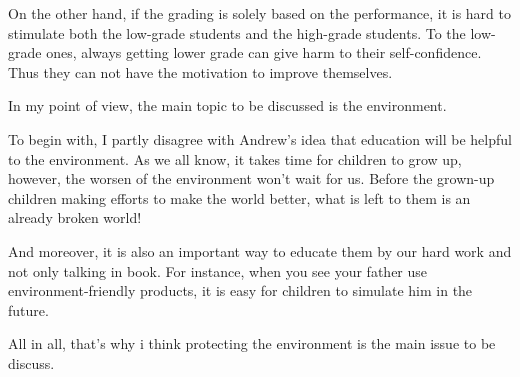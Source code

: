 On the other hand, if the grading is solely based on the performance, it is hard to stimulate both the low-grade students and the high-grade students. To the low-grade ones, always getting lower grade can give harm to their self-confidence. Thus they can not have the motivation to improve themselves.


In my point of view, the main topic to be discussed is the environment.

To begin with, I partly disagree with Andrew's idea that education will be helpful to the environment. As we all know, it takes time for children to grow up, however, the worsen of the environment won't wait for us. Before the grown-up children making efforts to make the world better, what is left to them is an already broken world!

And moreover, it is also an important way to educate them by our hard work and not only talking in book. For instance, when you see your father use environment-friendly products, it is easy for children to simulate him in the future.

All in all, that's why i think protecting the environment is the main issue to be discuss.


